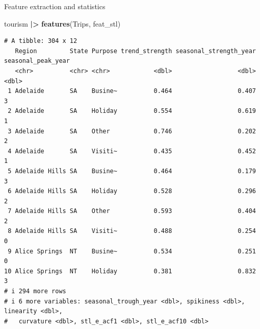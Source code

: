 \documentclass[
  14pt,
  ignorenonframetext,
  aspectratio=169,
]{beamer}
\newenvironment{Shaded}{\begin{snugshade}}{\end{snugshade}}
\newcommand{\FunctionTok}[1]{\textcolor[rgb]{0.13,0.29,0.53}{\textbf{#1}}}
\newcommand{\NormalTok}[1]{#1}
\newcommand{\SpecialCharTok}[1]{\textcolor[rgb]{0.81,0.36,0.00}{\textbf{#1}}}
\renewenvironment{Shaded}{\vspace*{0.15cm}\color{black}\fontsize{10}{10}\sf\begin{snugshade}\color{black}}{\end{snugshade}}
\begin{document}
\begin{frame}[fragile]{Feature extraction and statistics}
\protect{}\label{feature-extraction-and-statistics}
\fontsize{9}{10}\sf

\begin{Shaded}
\begin{Highlighting}[]
\NormalTok{tourism }\SpecialCharTok{|\textgreater{}} \FunctionTok{features}\NormalTok{(Trips, feat\_stl)}
\end{Highlighting}
\end{Shaded}

\begin{verbatim}
# A tibble: 304 x 12
   Region         State Purpose trend_strength seasonal_strength_year seasonal_peak_year
   <chr>          <chr> <chr>            <dbl>                  <dbl>              <dbl>
 1 Adelaide       SA    Busine~          0.464                  0.407                  3
 2 Adelaide       SA    Holiday          0.554                  0.619                  1
 3 Adelaide       SA    Other            0.746                  0.202                  2
 4 Adelaide       SA    Visiti~          0.435                  0.452                  1
 5 Adelaide Hills SA    Busine~          0.464                  0.179                  3
 6 Adelaide Hills SA    Holiday          0.528                  0.296                  2
 7 Adelaide Hills SA    Other            0.593                  0.404                  2
 8 Adelaide Hills SA    Visiti~          0.488                  0.254                  0
 9 Alice Springs  NT    Busine~          0.534                  0.251                  0
10 Alice Springs  NT    Holiday          0.381                  0.832                  3
# i 294 more rows
# i 6 more variables: seasonal_trough_year <dbl>, spikiness <dbl>, linearity <dbl>,
#   curvature <dbl>, stl_e_acf1 <dbl>, stl_e_acf10 <dbl>
\end{verbatim}
\end{frame}
\end{document}
